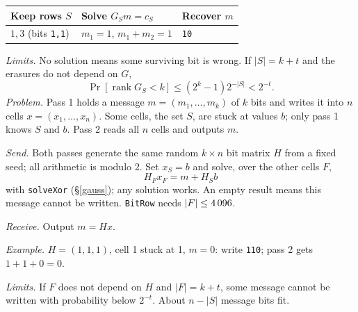 {\par\begin{tabular}{@{}lll@{}}
\toprule
Keep rows $S$ & Solve $G_S m=c_S$ & Recover $m$ \\
\midrule
$1,3$ (bits \texttt{1,1}) & $m_1=1$, $m_1+m_2=1$ & \texttt{10} \\
\bottomrule
\end{tabular}\par
\textit{Limits.} No solution means some surviving bit is wrong. If $|S|=k+t$ and the erasures do not depend on $G$,
\[ \Pr[\operatorname{rank}G_S<k]\le (2^k-1)2^{-|S|}<2^{-t}. \]
\textit{Problem.} Pass 1 holds a message $m=(m_1,\ldots,m_k)$ of $k$ bits and writes it into $n$ cells $x=(x_1,\ldots,x_n)$. Some cells, the set $S$, are stuck at values $b$; only pass 1 knows $S$ and $b$. Pass 2 reads all $n$ cells and outputs $m$.
\par\textit{Send.} Both passes generate the same random $k\times n$ bit matrix $H$ from a fixed seed; all arithmetic is modulo 2. Set $x_S=b$ and solve, over the other cells $F$,
\[ H_F x_F=m+H_S b \]
with \texttt{solveXor} (\S\ref{gauss}); any solution works. An empty result means this message cannot be written. \texttt{BitRow} needs $|F|\le4\,096$.
\par\textit{Receive.} Output $m=Hx$.
\par\textit{Example.} $H=(1,1,1)$, cell 1 stuck at 1, $m=0$: write \texttt{110}; pass 2 gets $1+1+0=0$.
\par\textit{Limits.} If $F$ does not depend on $H$ and $|F|=k+t$, some message cannot be written with probability below $2^{-t}$. About $n-|S|$ message bits fit.
}
\label{bitcodes}

